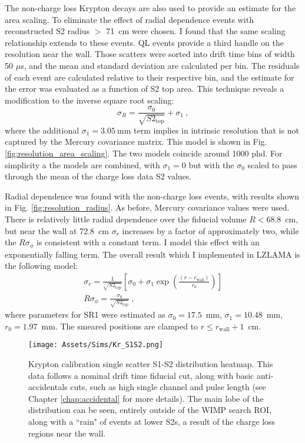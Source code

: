 The non-charge loss Krypton decays are also used to provide an estimate for the area scaling.
To eliminate the effect of radial dependence events with reconstructed S2 radius $>$ 71~cm were chosen. 
I found that the same scaling relationship extends to these events.
QL events provide a third handle on the resolution near the wall.
Those scatters were sorted into drift time bins of width 50 $\mu $s, and the mean and standard deviation are calculated per bin. 
The residuals of each event are calculated relative to their respective bin, and the estimate for the error was evaluated as a function of S2 top area.
This technique reveals a modification to the inverse square root scaling: 
\begin{equation}
    \sigma_R = \frac{\sigma_0}{\sqrt{S2_{\text{top}}}} + \sigma_1~,
\end{equation}
\noindent
where the additional $\sigma_1=3.05\mathrm{~mm}$ term implies in intrinsic resolution that is not captured by the Mercury covariance matrix.
This model is shown in Fig. \ref{fig:resolution_area_scaling}.
The two models coincide around 1000 phd.
For simplicity a the models are combined, with $\sigma_1=0$ but with the $\sigma_0$ scaled to pass through the mean of the charge loss data S2 values.

Radial dependence was found with the non-charge loss events, with results shown in Fig. \ref{fig:resolution_radius}.
As before, Mercury covariance values were used.
There is relatively little radial dependence over the fiducial volume $R<68.8$~cm, but near the wall at 72.8~cm $\sigma_r$ increases by a factor of approximately two, while the $R\sigma_\phi$ is consistent with a constant term.
I model this effect with an exponentially falling term.
The overall result which I implemented in LZLAMA is the following model:
\begin{align}
    \sigma_r = \frac{1}{\sqrt{S2_{\text{top}}}} [\sigma_0 + \sigma_1\exp(\frac{(r - r_{\text{wall}})}{r_0})]\\
     R\sigma_\phi = \frac{\sigma_0}{\sqrt{S2_{\text{top}}}}~,
\end{align}
\noindent
where parameters for SR1 were estimated as $\sigma_0=17.5$~mm, $\sigma_1=10.48$~mm, $r_0=1.97$~mm.
The smeared positions are clamped to $r\leq r_{\text{wall}}+1$~cm.

\begin{figure}
    \centering
    \texttt{[image: Assets/Sims/Kr\_S1S2.png]}
    \caption[Krypton calibration single scatter S1-S2 distribution histogram.]%
    {Krypton calibration single scatter S1-S2 distribution heatmap.
    This data follows a nominal drift time fiducial cut, along with basic anti-accidentals cuts, such as high single channel and pulse length (see Chapter \ref{chap:accidental} for more details).
    The main lobe of the distribution can be seen, entirely outside of the WIMP search ROI, along with a ``rain" of events at lower S2s, a result of the charge loss regions near the wall.
    }
    \label{fig:krypton_data}
\end{figure}

